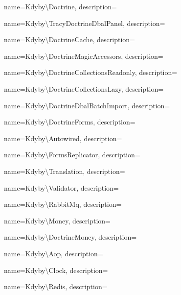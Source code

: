  {
  name={Kdy\-by\textbackslash{}Doc\-tri\-ne},
  description={} }

 {
  name={Kdy\-by\textbackslash{}Tra\-cy\-Doc\-tri\-ne\-D\-b\-a\-l\-Pa\-ne\-l},
  description={} }

 {
  name={Kdy\-by\textbackslash{}Doc\-tri\-ne\-Ca\-che},
  description={} }

 {
  name={Kdy\-by\textbackslash{}Doc\-tri\-ne\-Ma\-gic\-Acces\-sor\-s},
  description={} }

 {
  name={Kdy\-by\textbackslash{}Doc\-tri\-ne\-Collec\-ti\-ons\-Read\-on\-ly},
  description={} }

 {
  name={Kdy\-by\textbackslash{}Doc\-tri\-ne\-Collec\-ti\-ons\-La\-zy},
  description={} }

 {
  name={Kdy\-by\textbackslash{}Doc\-tri\-ne\-Dbal\-Batch\-Im\-port},
  description={} }

 {
  name={Kdy\-by\textbackslash{}Doc\-tri\-ne\-Forms},
  description={} }

 {
  name={Kdy\-by\textbackslash{}Auto\-wi\-red},
  description={} }

 {
  name={Kdy\-by\textbackslash{}Forms\-Re\-pli\-ca\-tor},
  description={} }

 {
  name={Kdy\-by\textbackslash{}Tran\-sla\-tion},
  description={} }

 {
  name={Kdy\-by\textbackslash{}Va\-li\-da\-tor},
  description={} }

 {
  name={Kdy\-by\textbackslash{}Ra\-bbit\-Mq},
  description={} }

 {
  name={Kdy\-by\textbackslash{}Mo\-ney},
  description={} }

 {
  name={Kdy\-by\textbackslash{}Doc\-tri\-ne\-Mo\-ney},
  description={} }

 {
  name={Kdy\-by\textbackslash{}Aop},
  description={} }

 {
  name={Kdy\-by\textbackslash{}Clo\-ck},
  description={} }

 {
  name={Kdy\-by\textbackslash{}Re\-di\-s},
  description={} }

